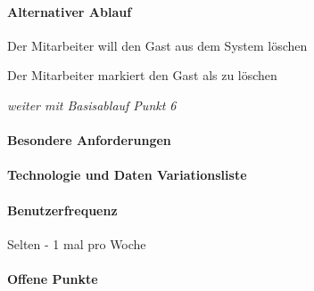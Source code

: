 \paragraph{Alternativer Ablauf}
\begin{longenum}
	\item
	\item
	\item
	\item
	\item
	\begin{longenum}
		\item Der Mitarbeiter will den Gast aus dem System löschen
		\begin{longenum}
			\item Der Mitarbeiter markiert den Gast als zu löschen
			\item \emph{weiter mit Basisablauf Punkt 6}
		\end{longenum}
	\end{longenum}
\end{longenum}

\paragraph{Besondere Anforderungen}

\paragraph{Technologie und Daten Variationsliste}

\paragraph{Benutzerfrequenz}
Selten - 1 mal pro Woche

\paragraph{Offene Punkte}

\newpage
